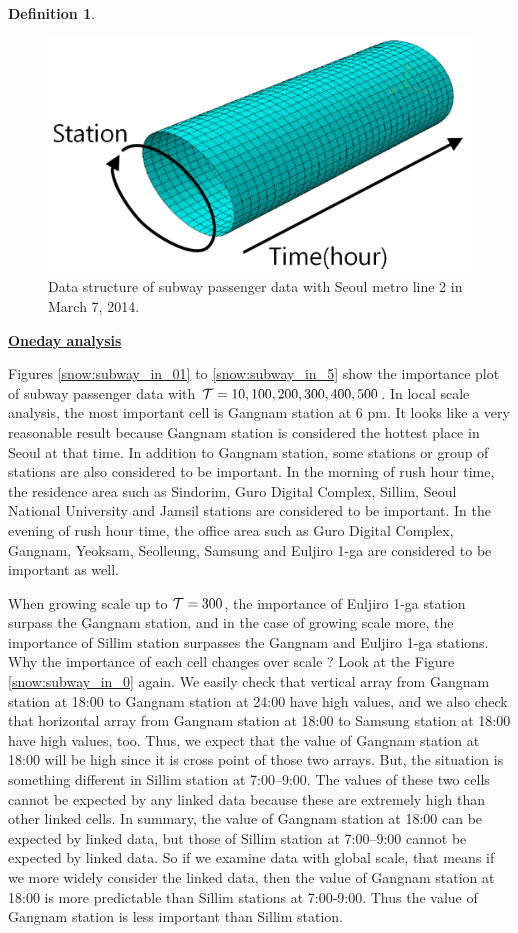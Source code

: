 \documentclass[preprint, review, 12pt]{article}
\theoremstyle{definition}
\newtheorem{dfn}{Definition}
\theoremstyle{remark}
\begin{document}
\begin{dfn}
\begin{figure}
\centering
\includegraphics[width=1\textwidth]{Fig/data_str.png}
\vspace{-13mm}
\caption{Data structure of subway passenger data with Seoul metro line 2 in March 7, 2014.} 
\label{snow:datasrt}
\end{figure}

\noindent\textbf{\underline{Oneday analysis}}

Figures \ref{snow:subway_in_01} to \ref{snow:subway_in_5} show the importance plot of subway passenger data with ${\cal T}=10,100,200,300,400,500$. In local scale analysis, the most important cell is Gangnam station at 6 pm. It looks like a very reasonable result because Gangnam station is considered the hottest place in Seoul at that time. In addition to Gangnam station, some stations or group of stations are also considered to be important. In the morning of rush hour time, the residence area such as Sindorim, Guro Digital Complex, Sillim, Seoul National University and Jamsil stations are considered to be important. In the evening of rush hour time, the office area such as Guro Digital Complex, Gangnam, Yeoksam, Seolleung, Samsung and Euljiro 1-ga are considered to be important as well. 

When growing scale up to ${\cal T}=300$, the importance of Euljiro 1-ga station surpass the Gangnam station, and in the case of  growing scale more, the importance of Sillim station surpasses the Gangnam and Euljiro 1-ga stations. Why the importance of each cell changes over scale ? Look at the Figure \ref{snow:subway_in_0} again. We easily check that vertical array from Gangnam station at 18:00 to Gangnam station at 24:00 have high values, and we also check that horizontal array from Gangnam station at 18:00 to Samsung station at 18:00 have high values, too. Thus, we expect that the value of Gangnam station at 18:00 will be high since it is cross point of those two arrays. But, the situation is something different in Sillim station at 7:00--9:00. The values of these two cells cannot be expected by any linked data because these are extremely high than other linked cells. In summary, the value of Gangnam station at 18:00 can be expected by linked data, but those of Sillim station at 7:00--9:00 cannot be expected by linked data. So if we examine data with global scale, that means if we more widely consider the linked data, then the value of Gangnam station at 18:00 is more predictable than Sillim stations at 7:00-9:00. Thus the value of Gangnam station is less important than Sillim station.


\end{dfn}
\end{document}
